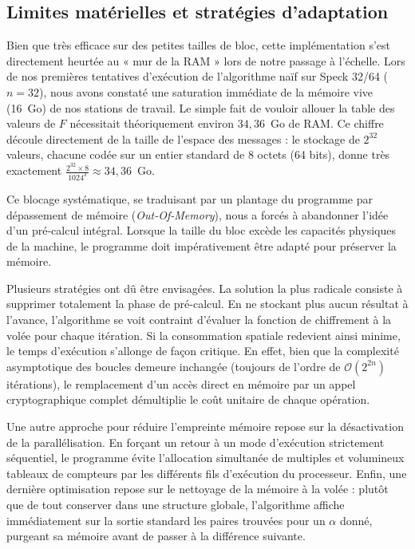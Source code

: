 \documentclass[a4paper,11pt]{article}
\begin{document}
\subsection{Limites matérielles et stratégies d'adaptation}

Bien que très efficace sur des petites tailles de bloc, cette implémentation s'est directement heurtée au « mur de la RAM » lors de notre passage à l'échelle. Lors de nos premières tentatives d'exécution de l'algorithme naïf sur Speck 32/64 ($n=32$), nous avons constaté une saturation immédiate de la mémoire vive (16~Go) de nos stations de travail. Le simple fait de vouloir allouer la table des valeurs de $F$ nécessitait théoriquement environ $34,36$~Go de RAM. Ce chiffre découle directement de la taille de l'espace des messages : le stockage de $2^{32}$ valeurs, chacune codée sur un entier standard de 8 octets (64 bits), donne très exactement $\frac{2^{32} \times 8}{1024^3} \approx 34,36$~Go.

Ce blocage systématique, se traduisant par un plantage du programme par dépassement de mémoire (\textit{Out-Of-Memory}), nous a forcés à abandonner l'idée d'un pré-calcul intégral. Lorsque la taille du bloc excède les capacités physiques de la machine, le programme doit impérativement être adapté pour préserver la mémoire.

Plusieurs stratégies ont dû être envisagées. La solution la plus radicale consiste à supprimer totalement la phase de pré-calcul. En ne stockant plus aucun résultat à l'avance, l'algorithme se voit contraint d'évaluer la fonction de chiffrement à la volée pour chaque itération. Si la consommation spatiale redevient ainsi minime, le temps d'exécution s'allonge de façon critique. En effet, bien que la complexité asymptotique des boucles demeure inchangée (toujours de l'ordre de $\mathcal{O}(2^{2n})$ itérations), le remplacement d'un accès direct en mémoire par un appel cryptographique complet démultiplie le coût unitaire de chaque opération.

Une autre approche pour réduire l'empreinte mémoire repose sur la désactivation de la parallélisation. En forçant un retour à un mode d'exécution strictement séquentiel, le programme évite l'allocation simultanée de multiples et volumineux tableaux de compteurs par les différents fils d'exécution du processeur. Enfin, une dernière optimisation repose sur le nettoyage de la mémoire à la volée : plutôt que de tout conserver dans une structure globale, l'algorithme affiche immédiatement sur la sortie standard les paires trouvées pour un $\alpha$ donné, purgeant sa mémoire avant de passer à la différence suivante.
\end{document}
